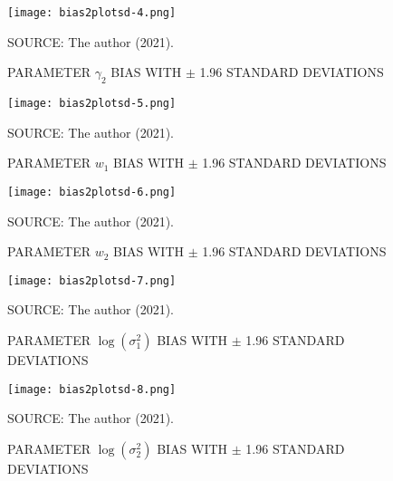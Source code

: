 \begin{figure}[H]
 \setlength{\abovecaptionskip}{.0001pt}
 \caption{PARAMETER \(\gamma_{2}\) BIAS WITH \(\pm\) 1.96 STANDARD
          DEVIATIONS}
 \vspace{0.2cm}\centering
 \texttt{[image: bias2plotsd-4.png]}\\
 \begin{footnotesize}
  SOURCE: The author (2021).
 \end{footnotesize}
 \label{fig:biassdgama2}
\end{figure}

\begin{figure}[H]
 \setlength{\abovecaptionskip}{.0001pt}
 \caption{PARAMETER \(w_{1}\) BIAS WITH \(\pm\) 1.96 STANDARD DEVIATIONS}
 \vspace{0.2cm}\centering
 \texttt{[image: bias2plotsd-5.png]}\\
 \begin{footnotesize}
  SOURCE: The author (2021).
 \end{footnotesize}
 \label{fig:biassdw1}
\end{figure}

\begin{figure}[H]
 \setlength{\abovecaptionskip}{.0001pt}
 \caption{PARAMETER \(w_{2}\) BIAS WITH \(\pm\) 1.96 STANDARD DEVIATIONS}
 \vspace{0.2cm}\centering
 \texttt{[image: bias2plotsd-6.png]}\\
 \begin{footnotesize}
  SOURCE: The author (2021).
 \end{footnotesize}
 \label{fig:biassdw2}
\end{figure}

\begin{figure}[H]
 \setlength{\abovecaptionskip}{.0001pt}
 \caption{PARAMETER \(\log(\sigma_{1}^{2})\) BIAS WITH \(\pm\) 1.96
          STANDARD DEVIATIONS}
 \vspace{0.2cm}\centering
 \texttt{[image: bias2plotsd-7.png]}\\
 \begin{footnotesize}
  SOURCE: The author (2021).
 \end{footnotesize}
 \label{fig:biassdlogs2_1}
\end{figure}

\begin{figure}[H]
 \setlength{\abovecaptionskip}{.0001pt}
 \caption{PARAMETER \(\log(\sigma_{2}^{2})\) BIAS WITH \(\pm\) 1.96
          STANDARD DEVIATIONS}
 \vspace{0.2cm}\centering
 \texttt{[image: bias2plotsd-8.png]}\\
 \begin{footnotesize}
  SOURCE: The author (2021).
 \end{footnotesize}
 \label{fig:biassdlogs2_2}
\end{figure}

